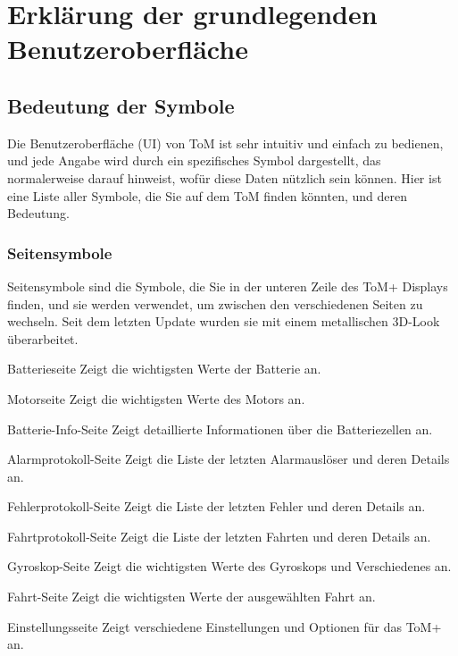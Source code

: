 \chapter{Erklärung der grundlegenden Benutzeroberfläche}

\section{Bedeutung der Symbole}
\label{sec:icon_list}

Die Benutzeroberfläche (UI) von ToM ist sehr intuitiv und einfach zu bedienen, und jede Angabe wird durch ein spezifisches Symbol dargestellt, das normalerweise darauf hinweist, wofür diese Daten nützlich sein können. Hier ist eine Liste aller Symbole, die Sie auf dem ToM finden könnten, und deren Bedeutung.

\subsection{Seitensymbole}
\label{sec:page_icon_list}

Seitensymbole sind die Symbole, die Sie in der unteren Zeile des ToM+ Displays finden, und sie werden verwendet, um zwischen den verschiedenen Seiten zu wechseln. Seit dem letzten Update wurden sie mit einem metallischen 3D-Look überarbeitet.

{Batterieseite}
{Zeigt die wichtigsten Werte der Batterie an.}

{Motorseite}
{Zeigt die wichtigsten Werte des Motors an.}

{Batterie-Info-Seite}
{Zeigt detaillierte Informationen über die Batteriezellen an.}

{Alarmprotokoll-Seite}
{Zeigt die Liste der letzten Alarmauslöser und deren Details an.}

{Fehlerprotokoll-Seite}
{Zeigt die Liste der letzten Fehler und deren Details an.}

{Fahrtprotokoll-Seite}
{Zeigt die Liste der letzten Fahrten und deren Details an.}

{Gyroskop-Seite}
{Zeigt die wichtigsten Werte des Gyroskops und Verschiedenes an.}

{Fahrt-Seite}
{Zeigt die wichtigsten Werte der ausgewählten Fahrt an.}

{Einstellungsseite}
{Zeigt verschiedene Einstellungen und Optionen für das ToM+ an.}

